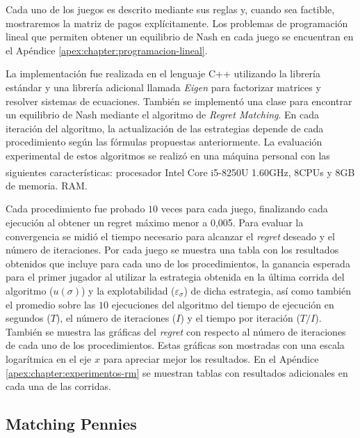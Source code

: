 Cada uno de los juegos es descrito mediante sus reglas y, cuando sea factible, mostraremos la matriz de pagos explícitamente. Los problemas de programación lineal que permiten obtener un equilibrio de Nash en cada juego se encuentran en el Apéndice \ref{apex:chapter:programacion-lineal}.

La implementación fue realizada en el lenguaje C++ utilizando la librería estándar y una librería adicional llamada \textit{Eigen} \cite{bib:eigen} para factorizar matrices y resolver sistemas de ecuaciones. También se implementó una clase para encontrar un equilibrio de Nash mediante el algoritmo de \textit{Regret Matching}. En cada iteración del algoritmo, la actualización de las estrategias depende de cada procedimiento según las fórmulas propuestas anteriormente. La evaluación experimental de estos algoritmos se realizó en una máquina personal con las siguientes características: procesador Intel\textsuperscript{\textregistered} Core\textsuperscript{\texttrademark} i5-8250U  1.60GHz, 8CPUs y 8GB de memoria. RAM.

Cada procedimiento fue probado $10$ veces para cada juego, finalizando cada ejecución al obtener un regret máximo menor a 0,005.  Para evaluar la convergencia se midió el tiempo necesario para alcanzar el \textit{regret} deseado y el número de iteraciones. Por cada juego se muestra una tabla con los resultados obtenidos que incluye para cada uno de los procedimientos, la ganancia esperada para el primer jugador al utilizar la estrategia obtenida en la última corrida del algoritmo ($u({\sigma})$) y la explotabilidad ($\varepsilon_{\sigma}$) de dicha estrategia, así como también el promedio sobre las $10$ ejecuciones del algoritmo del tiempo de ejecución en segundos ($T$), el número de iteraciones ($I$) y el tiempo por iteración ($T/I$). También se muestra las gráficas del \textit{regret} con respecto al número de iteraciones de cada uno de los procedimientos. Estas gráficas son mostradas con una escala logarítmica en el eje $x$ para apreciar mejor los resultados. En el Apéndice \ref{apex:chapter:experimentos-rm} se muestran tablas con resultados adicionales en cada una de las corridas.

\subsection*{Matching Pennies}

